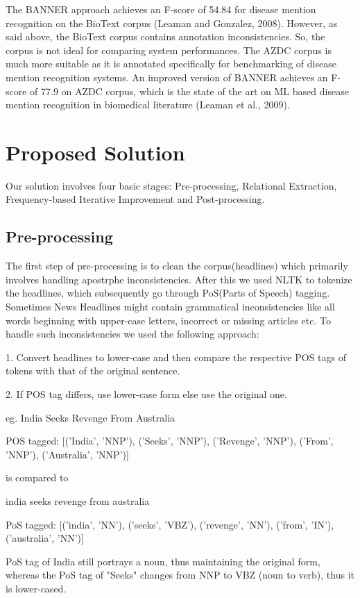 \documentclass{article}
\begin{document}
The BANNER approach achieves an F-score of 54.84 for disease mention recognition on
the BioText corpus (Leaman and Gonzalez, 2008). However, as said above, the BioText
corpus contains annotation inconsistencies. So, the corpus is not ideal for comparing
system performances. The AZDC corpus is much more suitable as it is annotated
specifically for benchmarking of disease mention recognition systems. An improved
version of BANNER achieves an F-score of 77.9 on AZDC corpus, which is the state of the
art on ML based disease mention recognition in biomedical literature (Leaman et al.,
2009).



\section{Proposed Solution}

Our solution involves four basic stages: Pre-processing, Relational Extraction, Frequency-based Iterative Improvement and Post-processing.

\subsection{Pre-processing}

The first step of pre-processing is to clean the corpus(headlines) which primarily involves handling apostrphe inconsistencies. After this we used NLTK to tokenize the headlines, which subsequently go through PoS(Parts of Speech) tagging. Sometimes News Headlines might contain grammatical inconsistencies like all words beginning with upper-case letters, incorrect or missing articles etc.  To handle such inconsistencies we used the following approach:

1. Convert headlines to lower-case and then compare the respective POS tags of tokens with that of the original sentence.

2. If POS tag differs, use lower-case form else use the original one.

eg. India Seeks Revenge From Australia

POS tagged: [('India', 'NNP'), ('Seeks', 'NNP'), ('Revenge', 'NNP'), ('From', 'NNP'), ('Australia', 'NNP')]

is compared to 

india seeks revenge from australia

PoS tagged: [('india', 'NN'), ('seeks', 'VBZ'), ('revenge', 'NN'), ('from', 'IN'), ('australia', 'NN')]

PoS tag of India still portrays a noun, thus maintaining the original form, whereas the PoS tag of "Seeks" changes from NNP to VBZ (noun to verb), thus it is lower-cased.
\end{document}
